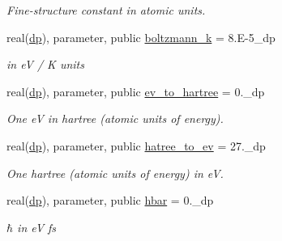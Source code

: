 \begin{DoxyCompactItemize}
\begin{DoxyCompactList}\small\item\em Fine-\/structure constant in atomic units. \end{DoxyCompactList}\item 
\mbox{\label{namespaceconstants__pop_a247ec198c661d1f71a84a2953dc1add8}} 
real(\mbox{\hyperlink{namespaceconstants__pop_aa40e688cf9ef9b7cf0db05c80879ca15}{dp}}), parameter, public \mbox{\hyperlink{namespaceconstants__pop_a247ec198c661d1f71a84a2953dc1add8}{boltzmann\+\_\+k}} = 8.\+E-\/5\+\_\+dp
\begin{DoxyCompactList}\small\item\em in eV / K units \end{DoxyCompactList}\item 
\mbox{\label{namespaceconstants__pop_af079e42c08b5b29f83ae03e82d838150}} 
real(\mbox{\hyperlink{namespaceconstants__pop_aa40e688cf9ef9b7cf0db05c80879ca15}{dp}}), parameter, public \mbox{\hyperlink{namespaceconstants__pop_af079e42c08b5b29f83ae03e82d838150}{ev\+\_\+to\+\_\+hartree}} = 0.\+\_\+dp
\begin{DoxyCompactList}\small\item\em One eV in hartree (atomic units of energy). \end{DoxyCompactList}\item 
\mbox{\label{namespaceconstants__pop_ad6f277e1c710648d407733689ac041b6}} 
real(\mbox{\hyperlink{namespaceconstants__pop_aa40e688cf9ef9b7cf0db05c80879ca15}{dp}}), parameter, public \mbox{\hyperlink{namespaceconstants__pop_ad6f277e1c710648d407733689ac041b6}{hatree\+\_\+to\+\_\+ev}} = 27.\+\_\+dp
\begin{DoxyCompactList}\small\item\em One hartree (atomic units of energy) in eV. \end{DoxyCompactList}\item 
\mbox{\label{namespaceconstants__pop_a4fd039ac08ba8388739583feeb5bc603}} 
real(\mbox{\hyperlink{namespaceconstants__pop_aa40e688cf9ef9b7cf0db05c80879ca15}{dp}}), parameter, public \mbox{\hyperlink{namespaceconstants__pop_a4fd039ac08ba8388739583feeb5bc603}{hbar}} = 0.\+\_\+dp
\begin{DoxyCompactList}\small\item\em $\hbar$ in eV fs \end{DoxyCompactList}\item 

\end{DoxyCompactItemize}
